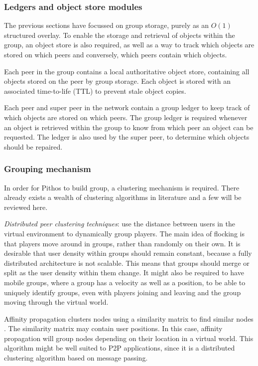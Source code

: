 \subsubsection{Ledgers and object store modules}

The previous sections have focussed on group storage, purely as an $O(1)$ structured overlay. To enable the storage and retrieval of objects within the group, an object store is also required, as well as a way to track which objects are stored on which peers and conversely, which peers contain which objects.

Each peer in the group contains a local authoritative object store, containing all objects stored on the peer by group storage. Each object is stored with an associated time-to-life (TTL) to prevent stale object copies.

Each peer and super peer in the network contain a group ledger to keep track of which objects are stored on which peers. The group ledger is required whenever an object is retrieved within the group to know from which peer an object can be requested. The ledger is also used by the super peer, to determine which objects should be repaired.

\subsubsection{Grouping mechanism}
\label{grouping_design}

In order for Pithos to build group, a clustering mechanism is required. There already exists a wealth of clustering algorithms in literature and a few will be reviewed here.

\emph{Distributed peer clustering techniques}: use the distance between users in the virtual environment to dynamically group players. The main idea of flocking is that players move around in groups, rather than randomly on their own. It is desirable that user density within groups should remain constant, because a fully distributed architecture is not scalable. This means that groups should merge or split as the user density within them change. It might also be required to have mobile groups, where a group has a velocity as well as a position, to be able to uniquely identify groups, even with players joining and leaving and the group moving through the virtual world.

Affinity propagation clusters nodes using a similarity matrix to find similar nodes \cite{affinity_propagation}. The similarity matrix may contain user positions. In this case, affinity propagation will group nodes depending on their location in a virtual world. This algorithm might be well suited to P2P applications, since it is a distributed clustering algorithm based on message passing.

